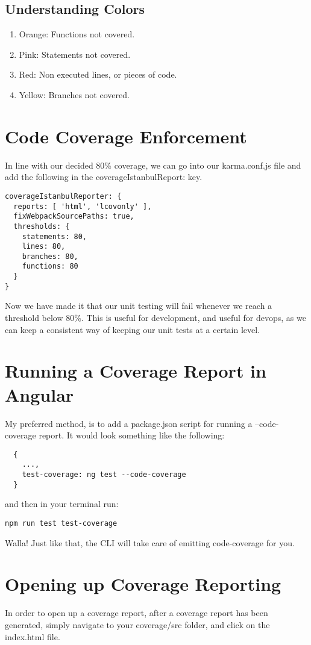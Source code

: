 \subsection{Understanding Colors}
\begin{enumerate}
  \item Orange: Functions not covered.
  \item Pink: Statements not covered.
  \item Red: Non executed lines, or pieces of code.
  \item Yellow: Branches not covered.
\end{enumerate}

\section{ Code Coverage Enforcement }
In line with our decided 80\% coverage, we can go into our karma.conf.js file
and add the following in the coverageIstanbulReport: key.
\begin{lstlisting}
coverageIstanbulReporter: {
  reports: [ 'html', 'lcovonly' ],
  fixWebpackSourcePaths: true,
  thresholds: {
    statements: 80,
    lines: 80,
    branches: 80,
    functions: 80
  }
}
\end{lstlisting}
Now we have made it that our unit testing will fail whenever we reach a
threshold below 80\%. This is useful for development, and useful for devops, as
we can keep a consistent way of keeping our unit tests at a certain level.

\section{ Running a Coverage Report in Angular }
My preferred method, is to add a package.json script for running a
--code-coverage report. It would look something like the following:
\begin{verbatim}
  {
    ...,
    test-coverage: ng test --code-coverage
  }
\end{verbatim}

and then in your terminal run:
\begin{verbatim}
npm run test test-coverage
\end{verbatim}

Walla! Just like that, the CLI will take care of emitting code-coverage for you.

\section{ Opening up Coverage Reporting }
In order to open up a coverage report, after a coverage report has been
generated, simply navigate to your coverage/src folder, and click on the
index.html file.

